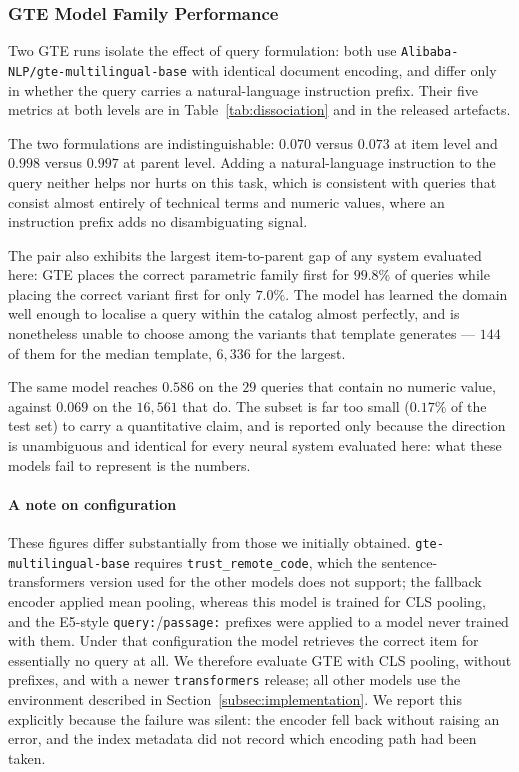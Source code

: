 \documentclass[preprint,12pt]{elsarticle}
\begin{document}
\subsubsection{GTE Model Family Performance}
\label{subsec:gte}

Two GTE runs isolate the effect of query formulation: both use \texttt{Alibaba-NLP/gte-multilingual-base} with identical document encoding, and differ only in whether the query carries a natural-language instruction prefix. Their five metrics at both levels are in Table~\ref{tab:dissociation} and in the released artefacts.

The two formulations are indistinguishable: $0.070$ versus $0.073$ at item level and $0.998$ versus $0.997$ at parent level. Adding a natural-language instruction to the query neither helps nor hurts on this task, which is consistent with queries that consist almost entirely of technical terms and numeric values, where an instruction prefix adds no disambiguating signal.

The pair also exhibits the largest item-to-parent gap of any system evaluated here: GTE places the correct parametric family first for $99.8\%$ of queries while placing the correct variant first for only $7.0\%$. The model has learned the domain well enough to localise a query within the catalog almost perfectly, and is nonetheless unable to choose among the variants that template generates --- $144$ of them for the median template, $6{,}336$ for the largest.

The same model reaches $0.586$ on the $29$ queries that contain no numeric value, against $0.069$ on the $16{,}561$ that do. The subset is far too small ($0.17\%$ of the test set) to carry a quantitative claim, and is reported only because the direction is unambiguous and identical for every neural system evaluated here: what these models fail to represent is the numbers.

\paragraph{A note on configuration} These figures differ substantially from those we initially obtained. \texttt{gte-multilingual-base} requires \texttt{trust\_remote\_code}, which the sentence-transformers version used for the other models does not support; the fallback encoder applied mean pooling, whereas this model is trained for CLS pooling, and the E5-style \texttt{query:}/\texttt{passage:} prefixes were applied to a model never trained with them. Under that configuration the model retrieves the correct item for essentially no query at all. We therefore evaluate GTE with CLS pooling, without prefixes, and with a newer \texttt{transformers} release; all other models use the environment described in Section~\ref{subsec:implementation}. We report this explicitly because the failure was silent: the encoder fell back without raising an error, and the index metadata did not record which encoding path had been taken.
\end{document}
